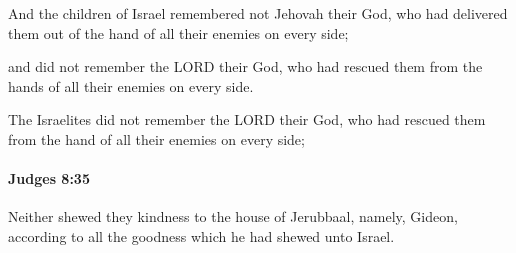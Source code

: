 			\begin{versebox}
					\item[BHS] 
					\item[ASV] And the children of Israel remembered not Jehovah their God, who had delivered them out of the hand of all their enemies on every side;
					\item[NIV] and did not remember the LORD their God, who had rescued them from the hands of all their enemies on every side.
					\item[NRSV] The Israelites did not remember the LORD their God, who had rescued them from the hand of all their enemies on every side;
			\end{versebox}

		\paragraph{Judges 8:35} %
			\label{JUDGES-8-35}

			Neither shewed they kindness to the house of Jerubbaal, namely, Gideon, according to all the goodness which he had shewed unto Israel.

